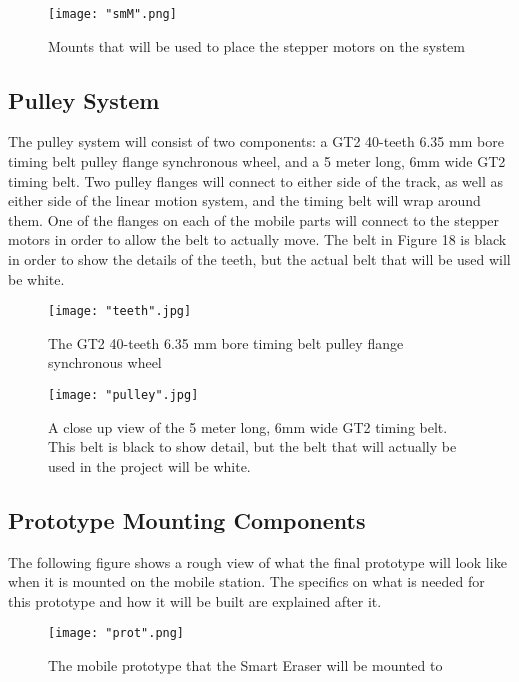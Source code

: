 \begin{figure}[H]
	\centering
	{\texttt{[image: "smM".png]}}
	\caption{  Mounts that will be used to place the stepper motors on the system
		\cite{hobby}}
	\label{fig:smM}
\end{figure}

\subsection{Pulley System}
 The pulley system will consist of two components: a GT2 40-teeth 6.35 mm bore timing belt pulley flange synchronous wheel, and a 5 meter long, 6mm wide GT2 timing belt. Two pulley flanges will connect to either side of the track, as well as either side of the linear motion system, and the timing belt will wrap around them. One of the flanges on each of the mobile parts will connect to the stepper motors in order to allow the belt to actually move. The belt in Figure 18 is black in order to show the details of the teeth, but the actual belt that will be used will be white.

\begin{figure}[H]
	\centering
	{\texttt{[image: "teeth".jpg]}}
	\caption{  The GT2 40-teeth 6.35 mm bore timing belt pulley flange synchronous wheel
		\cite{uxcell}}
	\label{fig:teeth}
\end{figure}

\begin{figure}[H]
	\centering
	{\texttt{[image: "pulley".jpg]}}
	\caption{  A close up view of the 5 meter long, 6mm wide GT2 timing belt. This belt is black to show detail, but the belt that will actually be used in the project will be white.
		\cite{merc}}
	\label{fig:pulley}
\end{figure}

\subsection{Prototype Mounting Components}

The following figure shows a rough view of what the final prototype will look like when it is mounted on the mobile station. The specifics on what is needed for this prototype and how it will be built are explained after it.

\begin{figure}[H]
	\centering
	{\texttt{[image: "prot".png]}}
	\caption{  The mobile prototype that the Smart Eraser will be mounted to
		\cite{hd1}}
	\label{fig:prot}
\end{figure}

